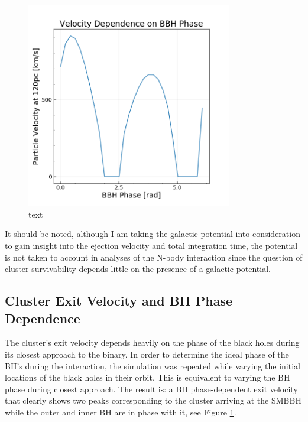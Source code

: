 \documentclass{aastex62}
\begin{document}
\begin{figure}
\includegraphics[width=9cm,height=9cm]{./Images/phase_loop.png}
\centering
\caption{text\label{fig2}}
\end{figure}

 It should be noted, although I am taking the galactic potential into consideration to gain insight into the ejection velocity and total integration time, the potential is not taken to account in analyses of the N-body interaction since the question of cluster survivability depends little on the presence of a galactic potential. 
\subsection{Cluster Exit Velocity and BH Phase Dependence}
The cluster's exit velocity depends heavily on the phase of the black holes during its closest approach to the binary. In order to determine the ideal phase of the BH's during the interaction, the simulation was repeated while varying the initial locations of the black holes in their orbit. This is equivalent to varying the BH phase during closest approach. The result is: a BH phase-dependent exit velocity that clearly shows two peaks corresponding to the cluster arriving at the SMBBH while the outer and inner BH are in phase with it, see Figure \ref{fig2}.
\end{document}
